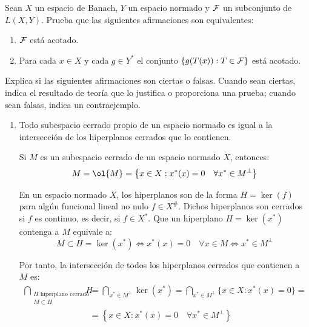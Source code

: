\documentclass[12pt]{article}
\begin{document}
    \newpage
    \setcounter{ejercicio}{0} %


    \begin{ejercicio}
        Sean $X$ un espacio de Banach, $Y$ un espacio normado y $\mathcal{F}$ un subconjunto de $L(X,Y)$. Prueba que las siguientes afirmaciones son equivalentes:
        \begin{enumerate}[label=\alph*)]
            \item $\mathcal{F}$ está acotado.
            \item Para cada $x\in X$ y cada $g\in Y^\ast$ el conjunto $\{g(T(x)) : T\in \mathcal{F}\}$ está acotado.
        \end{enumerate}
    \end{ejercicio}

    \begin{ejercicio}
        Explica si las siguientes afirmaciones son ciertas o falsas. Cuando sean ciertas, indica el resultado de teoría que lo justifica o proporciona una prueba; cuando sean falsas, indica un contraejemplo.
        \begin{enumerate}[label=(\alph*)]
            \item Todo subespacio cerrado propio de un espacio normado es igual a la intersección de los hiperplanos cerrados que lo contienen.
            
            Si $M$ es un subespacio cerrado de un espacio normado $X$, entonces:
            \begin{equation*}
                M = \ol{M} = \left\{x\in X : x^*(x) = 0 \quad \forall x^* \in M^\perp\right\}
            \end{equation*}

            En un espacio normado $X$, los hiperplanos son de la forma $H = \ker(f)$ para algún funcional lineal no nulo $f\in X^{\#}$. Dichos hiperplanos son cerrados si $f$ es continuo, es decir, si $f\in X^\ast$. Que un hiperplano $H=\ker(x^*)$ contenga a $M$ equivale a:
            \begin{equation*}
                M \subset H = \ker(x^*) \Longleftrightarrow x^*(x) = 0 \quad \forall x\in M \Longleftrightarrow x^* \in M^\perp
            \end{equation*}

            Por tanto, la intersección de todos los hiperplanos cerrados que contienen a $M$ es:
            \begin{align*}
                \bigcap_{\substack{H \text{ hiperplano cerrado} \\ M \subset H}} H &= \bigcap_{x^* \in M^\perp} \ker(x^*) = \bigcap_{x^* \in M^\perp} \{x\in X : x^*(x) = 0\} =\\&= \left\{x\in X : x^*(x) = 0 \quad \forall x^* \in M^\perp\right\}
            \end{align*}


\end{enumerate}
\end{ejercicio}
\end{document}
